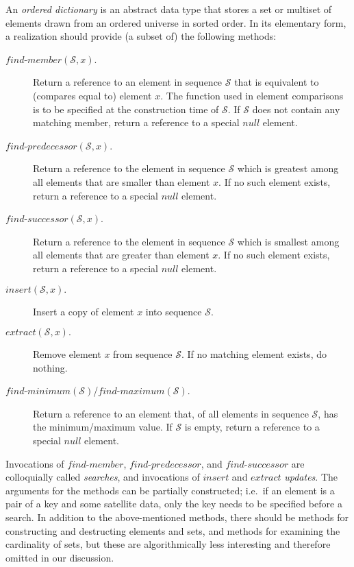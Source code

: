 \documentclass{DIKU-article}
\newcommand{\Findmin}{\mbox{$\mathit{find}$\textnormal{-}}\allowbreak{}\mbox{$\mathit{minimum}$}}
\newcommand{\Findmax}{\mbox{$\mathit{find}$\textnormal{-}}\allowbreak{}\mbox{$\mathit{maximum}$}}
\newcommand{\Member}{\mbox{$\mathit{find}$\textnormal{-}}\allowbreak{}\mbox{$\mathit{member}$}}
\newcommand{\Predecessor}{\mbox{$\mathit{find}$\textnormal{-}}\allowbreak{}\mbox{$\mathit{predecessor}$}}
\newcommand{\Successor}{\mbox{$\mathit{find}$\textnormal{-}}\allowbreak{}\mbox{$\mathit{successor}$}}
\newcommand{\Insert}{\mbox{$\mathit{insert}$}}
\newcommand{\Extract}{\mbox{$\mathit{extract}$}}
\newcommand{\Null}{\mbox{$\mathit{null}$}}
\begin{document}
An \emph{ordered dictionary} is an abstract data type that stores a
set or multiset of elements drawn from an ordered universe
in sorted order.  In its elementary form, a realization should provide
(a subset of) the following methods:
\begin{description}
\item[\Member{}$(\mathcal{S}, x).$] Return a reference to an element in sequence
$\mathcal{S}$ that is equivalent to (compares equal to) element $x$.  The
function used in element comparisons is to be specified at the
construction time of $\mathcal{S}$. If $\mathcal{S}$ does not contain any matching member,
return a reference to a special \Null{} element.

\item[\Predecessor{}$(\mathcal{S}, x).$] Return a reference to the element in
sequence $\mathcal{S}$ which is greatest among all elements that are smaller than
element $x$. If no such element exists, return a reference to a
special \Null{} element.

\item[\Successor{}$(\mathcal{S}, x).$] Return a reference to the element in sequence
$\mathcal{S}$ which is smallest among all elements that are greater than element
$x$.  If no such element exists, return a reference to a special
\Null{} element.

\item[\Insert{}$(\mathcal{S}, x).$] Insert a copy of element $x$ into sequence $\mathcal{S}$.

\item[\Extract{}$(\mathcal{S}, x).$] Remove element $x$ from sequence $\mathcal{S}$. If no
matching element exists, do nothing.

\item[\Findmin$(\mathcal{S})$/\Findmax$(\mathcal{S}).$] Return a reference to an element
that, of all elements in sequence $\mathcal{S}$, has the minimum/maximum value. 
If $\mathcal{S}$ is empty, return a reference to a special
\Null{} element.

\end{description}
Invocations of \Member{}, \Predecessor{}, and \Successor{} are
colloquially called \emph{searches}, and invocations of \Insert{} and
\Extract{} \emph{updates}. The arguments for the methods can be
partially constructed; i.e.~if an element is a pair of a key and some
satellite data, only the key needs to be specified before a search.
In addition to the above-mentioned methods, there should be methods
for constructing and destructing elements and sets, and methods for
examining the cardinality of sets, but these are algorithmically less
interesting and therefore omitted in our discussion.
\end{document}
